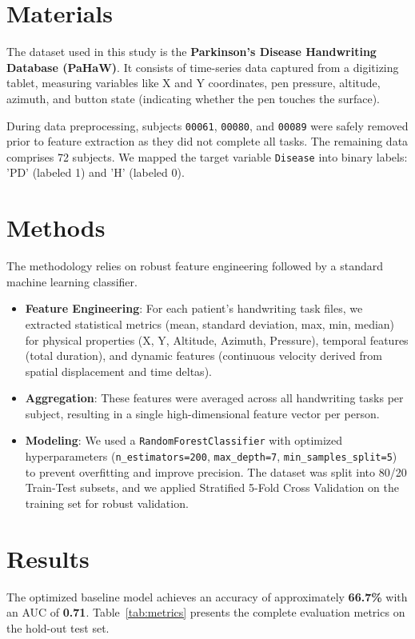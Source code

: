 \documentclass{article}
\begin{document}
\section{Materials}
The dataset used in this study is the \textbf{Parkinson's Disease Handwriting Database (PaHaW)}. It consists of time-series data captured from a digitizing tablet, measuring variables like X and Y coordinates, pen pressure, altitude, azimuth, and button state (indicating whether the pen touches the surface). 

During data preprocessing, subjects \texttt{00061}, \texttt{00080}, and \texttt{00089} were safely removed prior to feature extraction as they did not complete all tasks. The remaining data comprises 72 subjects. We mapped the target variable \texttt{Disease} into binary labels: 'PD' (labeled 1) and 'H' (labeled 0). 

\section{Methods}
The methodology relies on robust feature engineering followed by a standard machine learning classifier.
\begin{itemize}
    \item \textbf{Feature Engineering}: For each patient's handwriting task files, we extracted statistical metrics (mean, standard deviation, max, min, median) for physical properties (X, Y, Altitude, Azimuth, Pressure), temporal features (total duration), and dynamic features (continuous velocity derived from spatial displacement and time deltas).
    \item \textbf{Aggregation}: These features were averaged across all handwriting tasks per subject, resulting in a single high-dimensional feature vector per person.
    \item \textbf{Modeling}: We used a \texttt{RandomForestClassifier} with optimized hyperparameters (\texttt{n\_estimators=200}, \texttt{max\_depth=7}, \texttt{min\_samples\_split=5}) to prevent overfitting and improve precision. The dataset was split into 80/20 Train-Test subsets, and we applied Stratified 5-Fold Cross Validation on the training set for robust validation.
\end{itemize}

\section{Results}
The optimized baseline model achieves an accuracy of approximately \textbf{66.7\%} with an AUC of \textbf{0.71}. Table~\ref{tab:metrics} presents the complete evaluation metrics on the hold-out test set.
\end{document}
